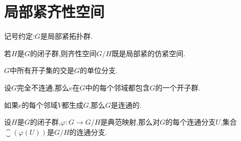 \section{局部紧齐性空间}

记号约定:$G$是局部紧拓扑群.

\begin{proposition}{}{}
	若$H$是$G$的闭子群,则齐性空间$G/H$既是局部紧的仿紧空间.
\end{proposition}

\begin{proposition}{}{}
	$G$中所有开子集的交是$G$的单位分支.
\end{proposition}

\begin{corollary}{}{}
	设$G$完全不连通,那么$e$在$G$中的每个邻域都包含$G$的一个开子群.
\end{corollary}

\begin{corollary}{}{}
	如果$e$的每个邻域$V$都生成$G$,那么$G$是连通的.
\end{corollary}

\begin{corollary}{}{}
	设$H$是$G$的闭子群,$\varphi:G\to G/H$是典范映射,那么对$G$的每个连通分支$U$,集合$\closure
	\left(\varphi\left(U\right)\right)$是$G/H$的连通分支.
\end{corollary}